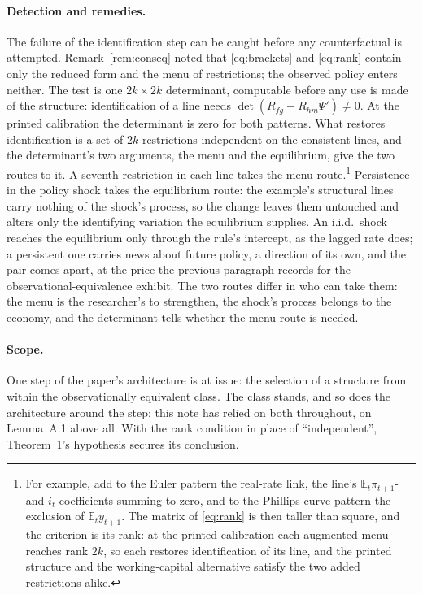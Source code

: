\documentclass[11pt]{article}
\theoremstyle{remark}
\newcommand{\E}{\mathbb{E}}
\begin{document}
\paragraph{Detection and remedies.}
The failure of the identification step can be caught before any counterfactual is attempted. Remark~\ref{rem:conseq} noted that \eqref{eq:brackets} and \eqref{eq:rank} contain only the reduced form and the menu of restrictions; the observed policy enters neither. The test is one $2k\times2k$ determinant, computable before any use is made of the structure: identification of a line needs $\det(R_{fg}-R_{hm}\Psi')\neq0$. At the printed calibration the determinant is zero for both patterns. What restores identification is a set of $2k$ restrictions independent on the consistent lines, and the determinant's two arguments, the menu and the equilibrium, give the two routes to it. A seventh restriction in each line takes the menu route.\footnote{For example, add to the Euler pattern the real-rate link, the line's $\E_t\pi_{t+1}$- and $i_t$-coefficients summing to zero, and to the Phillips-curve pattern the exclusion of $\E_ty_{t+1}$. The matrix of \eqref{eq:rank} is then taller than square, and the criterion is its rank: at the printed calibration each augmented menu reaches rank $2k$, so each restores identification of its line, and the printed structure and the working-capital alternative satisfy the two added restrictions alike.} Persistence in the policy shock takes the equilibrium route: the example's structural lines carry nothing of the shock's process, so the change leaves them untouched and alters only the identifying variation the equilibrium supplies. An i.i.d.\ shock reaches the equilibrium only through the rule's intercept, as the lagged rate does; a persistent one carries news about future policy, a direction of its own, and the pair comes apart, at the price the previous paragraph records for the observational-equivalence exhibit. The two routes differ in who can take them: the menu is the researcher's to strengthen, the shock's process belongs to the economy, and the determinant tells whether the menu route is needed.

\paragraph{Scope.}
One step of the paper's architecture is at issue: the selection of a structure from within the observationally equivalent class. The class stands, and so does the architecture around the step; this note has relied on both throughout, on Lemma~A.1 above all. With the rank condition in place of ``independent'', Theorem~1's hypothesis secures its conclusion.
\end{document}
